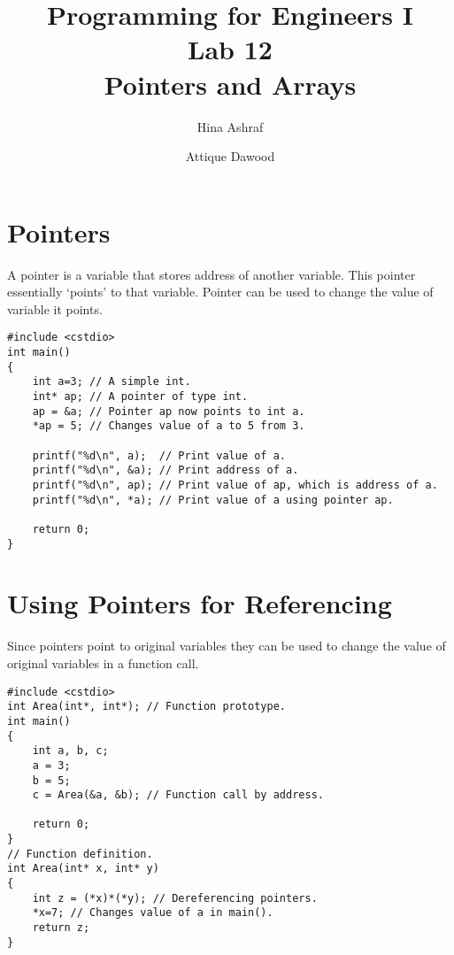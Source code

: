 \documentclass[12pt,a4paper]{article}
\title{\vspace{-2cm}Programming for Engineers I\\Lab 12\\Pointers and Arrays}
\author{Hina Ashraf\and Attique Dawood}
\begin{document}
\maketitle
\section{Pointers}
A pointer is a variable that stores address of another variable. This pointer essentially `points' to that variable. Pointer can be used to change the value of variable it points.
\begin{lstlisting}[caption={Pointers}]
#include <cstdio>
int main()
{
	int a=3; // A simple int.
	int* ap; // A pointer of type int.
	ap = &a; // Pointer ap now points to int a.
	*ap = 5; // Changes value of a to 5 from 3.

	printf("%d\n", a);  // Print value of a.
	printf("%d\n", &a); // Print address of a.
	printf("%d\n", ap); // Print value of ap, which is address of a.
	printf("%d\n", *a); // Print value of a using pointer ap.

	return 0;
}
\end{lstlisting}
\section{Using Pointers for Referencing}
Since pointers point to original variables they can be used to change the value of original variables in a function call.
\begin{lstlisting}[caption={Pointers as Arguments}]
#include <cstdio>
int Area(int*, int*); // Function prototype.
int main()
{
	int a, b, c;
	a = 3;
	b = 5;
	c = Area(&a, &b); // Function call by address.
	
	return 0;
}
// Function definition.
int Area(int* x, int* y)
{
	int z = (*x)*(*y); // Dereferencing pointers.
	*x=7; // Changes value of a in main().
	return z;
}
\end{lstlisting}
\end{document}
